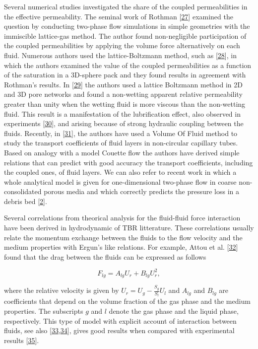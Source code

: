 \documentclass[]{article}
\begin{document}
Several numerical studies investigated the share of the coupled
permeabilities in the effective permeability. The seminal work of
Rothman {[}\protect\hyperlink{ref-Rothman1990}{27}{]} examined the
question by conducting two-phase flow simulations in simple geometries
with the immiscible lattice-gas method. The author found non-negligible
participation of the coupled permeabilities by applying the volume force
alternatively on each fluid. Numerous authors used the lattice-Boltzmann
method, such as {[}\protect\hyperlink{ref-Li2005}{28}{]}, in which the
authors examined the value of the coupled permeabilities as a function
of the saturation in a 3D-sphere pack and they found results in
agreement with Rothman's results. In
{[}\protect\hyperlink{ref-Yiotis2007}{29}{]} the authors used a lattice
Boltzmann method in 2D and 3D pore networks and found a non-wetting
apparent relative permeability greater than unity when the wetting fluid
is more viscous than the non-wetting fluid. This result is a
manifestation of the lubrification effect, also observed in experiments
{[}\protect\hyperlink{ref-odeh1959effect}{30}{]}, and arising because of
strong hydraulic coupling between the fluids. Recently, in
{[}\protect\hyperlink{ref-shams2018study}{31}{]}, the authors have used
a Volume Of Fluid method to study the transport coefficients of fluid
layers in non-circular capillary tubes. Based on analogy with a model
Couette flow the authors have derived simple relations that can predict
with good accuracy the transport coefficients, including the coupled
ones, of fluid layers. We can also refer to recent work in which a whole
analytical model is given for one-dimensional two-phase flow in coarse
non-consolidated porous media and which correctly predicts the pressure
loss in a debris bed
{[}\protect\hyperlink{ref-clavier2017modeling}{2}{]}.

Several correlations from theorical analysis for the fluid-fluid force
interaction have been derived in hydrodynamic of TBR litterature. These
correlations usually relate the momentum exchange between the fluids to
the flow velocity and the medium properties with Ergun's like relations.
For example, Attou et al. {[}\protect\hyperlink{ref-Attou1999}{32}{]}
found that the drag between the fluids can be expressed as follows

\[
F_{lg} = A_{lg} U_r + B_{lg} U_r^2,
\]

where the relative velocity is given by \(U_r=U_g-\frac{S_g}{S_l}U_l\)
and \(A_{lg}\) and \(B_{lg}\) are coefficients that depend on the volume
fraction of the gas phase and the medium properties. The subscripts
\(g\) and \(l\) denote the gas phase and the liquid phase, respectively.
This type of model with explicit account of interaction between fluids,
see also
{[}\protect\hyperlink{ref-tung1988hydrodynamic}{33},\protect\hyperlink{ref-iliuta2005modelling}{34}{]},
gives good results when compared with experimental results
{[}\protect\hyperlink{ref-wang2013modelling}{35}{]}.
\end{document}
